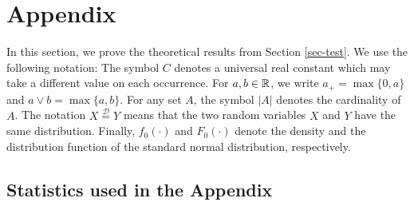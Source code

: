 \documentclass[a4paper,12pt]{article}
\begin{document}
\section{Appendix}\label{sec-appendix}
In this section, we prove the theoretical results from Section \ref{sec-test}. We use the following notation: The symbol $C$ denotes a universal real constant which may take a different value on each occurrence. For $a,b \in \mathbb{R}$, we write $a_+ = \max \{0,a\}$ and $a \vee b = \max\{a,b\}$. For any set $A$, the symbol $|A|$ denotes the cardinality of $A$. The notation $X \stackrel{\mathcal{D}}{=} Y$ means that the two random variables $X$ and $Y$ have the same distribution. Finally, $f_0(\cdot)$ and $F_0(\cdot)$ denote the density and the distribution function of the standard normal distribution, respectively.

\subsection{Statistics used in the Appendix}\label{subsec-appendix-stats}
\end{document}
